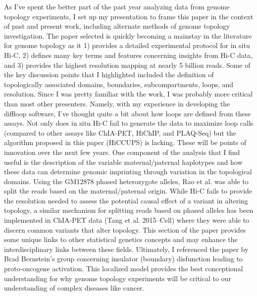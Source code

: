 \documentclass[12pt]{article}
\begin{document}
\begin{addmargin}[6.5mm]{4mm}  
As I've spent the better part of the past year analyzing data from genome topology experiments, I set up my presentation to frame this paper in the context of past and present work, including alternate methods of genome topology investigation. The paper selected is quickly becoming a mainstay in the literature for genome topology as it 1) provides a detailed experimental protocol for in situ Hi-C, 2) defines many key terms and features concerning insights from Hi-C data, and 3) provides the highest resolution mapping at nearly 5 billion reads. Some of the key discussion points that I highlighted included the definition of topologically associated domains, boundaries, subcompartments, loops, and resolution. \newline \newline Since I was pretty familiar with the work, I was probably more critical than most other presenters. Namely, with my experience in developing the diffloop software, I've thought quite a bit about how loops are defined from these assays. Not only does in situ Hi-C fail to generate the data to maximize loop calls (compared to other assays like ChIA-PET, HiChIP, and PLAQ-Seq) but the algorithm proposed in this paper (HiCCUPS) is lacking. These will be points of innovation over the next few years. \newline \newline One component of the analysis that I find useful is the description of the variable maternal/paternal haplotypes and how these data can determine genomic imprinting through variation in the topological domains. Using the GM12878 phased heterozygote alleles, Rao et al. was able to split the reads based on the maternal/paternal origin. While Hi-C fails to provide the resolution needed to assess the potential causal effect of a variant in altering topology, a similar mechanism for splitting reads based on phased alleles has been implemented in ChIA-PET data (Tang et al. 2015--Cell) where they were able to discern common variants that alter topology. This section of the paper provides some unique links to other statistical genetics concepts and may enhance the interdisciplinary links between these fields. \newline \newline Ultimately, I referenced the paper by Brad Bernstein's group concerning insulator (boundary) disfunction leading to proto-oncogene activation. This localized model provides the best conceptional understanding for why genome topology experiments will be critical to our understanding of complex diseases like cancer. 

\end{addmargin}
\end{document}
